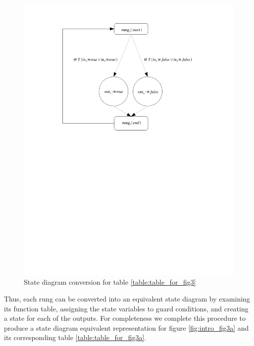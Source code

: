 \begin{figure}[h]
    \centering
    \includegraphics[trim= 00mm 140mm 40mm 10mm, clip, width=\imgmed]{./images/intro_or_graph.pdf} %
    \caption{State diagram conversion for table \ref{table:table_for_fig3}}
    \label{fig:intro_or_graph}
\end{figure}

Thus, each rung can be converted into an equivalent state diagram by examining its 
function table, assigning the state variables to guard conditions, and creating a
state for each of the outputs. For completeness we complete this procedure to produce
a state diagram equivalent representation for figure \ref{fig:intro_fig3a} and its
corresponding table \ref{table:table_for_fig3a}.


